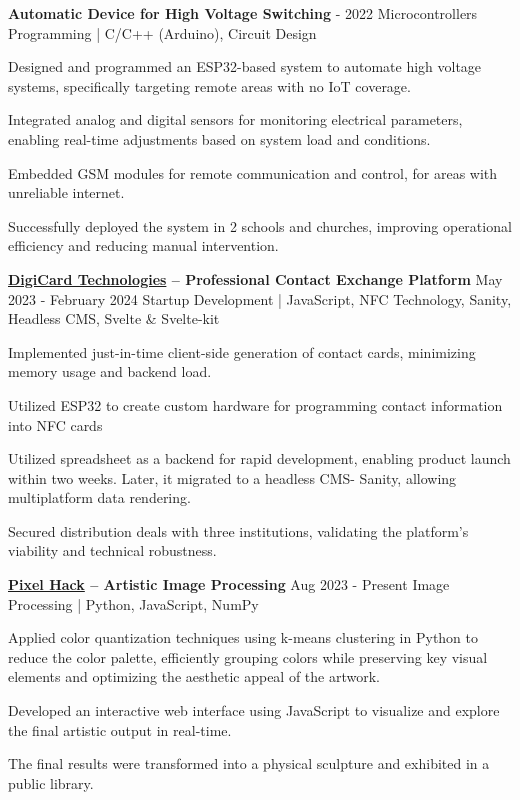 \begin{rSection}
    \begin{rSubsection}
        {\bf Automatic Device for High Voltage Switching}
        { - 2022}
        {Microcontrollers Programming {\normalfont \small \ttfamily | C/C++ (Arduino), Circuit Design} }
        {}
        \item Designed and programmed an ESP32-based system to automate high voltage systems, specifically targeting remote areas with no IoT coverage.
        \item Integrated analog and digital sensors for monitoring electrical parameters, enabling real-time adjustments based on system load and conditions.
        \item Embedded GSM modules for remote communication and control, for areas with unreliable internet.
        \item Successfully deployed the system in 2 schools and churches, improving operational efficiency and reducing manual intervention.
    \end{rSubsection}

    \begin{rSubsection}
        {\bf \href{https://techmasterevent.com/project/1andonly}{DigiCard Technologies} – Professional Contact Exchange Platform}
        {\ttfamily May 2023 - February 2024}
        {Startup Development {\normalfont \small \ttfamily | JavaScript, NFC Technology, Sanity, Headless CMS, Svelte \& Svelte-kit} }
        {}
        \item Implemented just-in-time client-side generation of contact cards, minimizing memory usage and backend load.
        \item Utilized ESP32 to create custom hardware for programming contact information into NFC cards
        \item Utilized spreadsheet as a backend for rapid development, enabling product launch within two weeks. Later, it migrated to a headless CMS- Sanity, allowing multiplatform data rendering.
        \item Secured distribution deals with three institutions, validating the platform’s viability and technical robustness.
    \end{rSubsection}

    \begin{rSubsection}
        {\bf \href{https://pixel-hack.vercel.app/}{Pixel Hack} – Artistic Image Processing}
        {\ttfamily Aug 2023 - Present}
        {Image Processing {\normalfont \small \ttfamily | Python, JavaScript, NumPy} }
        {}
        \item Applied color quantization techniques using k-means clustering in Python to reduce the color palette, efficiently grouping colors while preserving key visual elements and optimizing the aesthetic appeal of the artwork.
        \item Developed an interactive web interface using JavaScript to visualize and explore the final artistic output in real-time.
        \item The final results were transformed into a physical sculpture and exhibited in a public library.
    \end{rSubsection}
    

\end{rSection}
